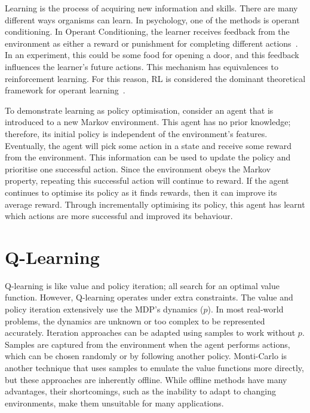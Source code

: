 \documentclass[]{final_report}
\begin{document}
Learning is the process of acquiring new information and skills. There are many different ways organisms can learn. In psychology, one of the methods is operant conditioning. In Operant Conditioning, the learner receives feedback from the environment as either a reward or punishment for completing different actions~\cite{staddon2003operant}. In an experiment, this could be some food for opening a door, and this feedback influences the learner's future actions. This mechanism has equivalences to reinforcement learning. For this reason, RL is considered the dominant theoretical framework for operant learning~\cite{shteingart2014reinforcement}. 

To demonstrate learning as policy optimisation, consider an agent that is introduced to a new Markov environment. This agent has no prior knowledge; therefore, its initial policy is independent of the environment's features. Eventually, the agent will pick some action in a state and receive some reward from the environment. This information can be used to update the policy and prioritise one successful action. Since the environment obeys the Markov property, repeating this successful action will continue to reward. If the agent continues to optimise its policy as it finds rewards, then it can improve its average reward. Through incrementally optimising its policy, this agent has learnt which actions are more successful and improved its behaviour.

\section{Q-Learning}\label{sect:q-learning}


Q-learning is like value and policy iteration; all search for an optimal value function. However, Q-learning operates under extra constraints. The value and policy iteration extensively use the MDP's dynamics ($p$). In most real-world problems, the dynamics are unknown or too complex to be represented accurately. Iteration approaches can be adapted using samples to work without $p$. Samples are captured from the environment when the agent performs actions, which can be chosen randomly or by following another policy. Monti-Carlo is another technique that uses samples to emulate the value functions more directly, but these approaches are inherently offline. While offline methods have many advantages, their shortcomings, such as the inability to adapt to changing environments, make them unsuitable for many applications. 
\end{document}
